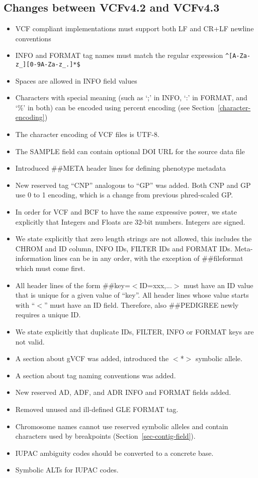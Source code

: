 \documentclass[8pt]{article}
\begin{document}
\subsection{Changes between VCFv4.2 and VCFv4.3}

\begin{itemize}
\item VCF compliant implementations must support both LF and CR+LF newline conventions
\item INFO and FORMAT tag names must match the regular expression \texttt{\^{}[A-Za-z\_][0-9A-Za-z\_.]*\$}
\item Spaces are allowed in INFO field values
\item Characters with special meaning (such as `;' in INFO, `:' in FORMAT, and `\%' in both) can be encoded using percent encoding (see Section~\ref{character-encoding})
\item The character encoding of VCF files is UTF-8.
\item The SAMPLE field can contain optional DOI URL for the source data file
\item Introduced \#\#META header lines for defining phenotype metadata
\item New reserved tag ``CNP'' analogous to ``GP'' was added. Both CNP and GP use 0 to 1 encoding, which is a change from previous phred-scaled GP.
\item In order for VCF and BCF to have the same expressive power, we state explicitly that Integers and Floats are 32-bit numbers.
Integers are signed.
\item We state explicitly that zero length strings are not allowed, this includes the CHROM and ID column, INFO IDs, FILTER IDs and FORMAT IDs.
Meta-information lines can be in any order, with the exception of \#\#fileformat which must come first. 
\item All header  lines of the form \#\#key=$<$ID=xxx,...$>$ must have an ID value that is unique for a given value of ``key''.
All header lines whose value starts with ``$<$'' must have an ID field.
Therefore, also \#\#PEDIGREE newly requires a unique ID.
\item We state explicitly that duplicate IDs, FILTER, INFO or FORMAT keys are not valid.
\item A section about gVCF was added, introduced the $<$*$>$ symbolic allele.
\item A section about tag naming conventions was added.
\item New reserved AD, ADF, and ADR INFO and FORMAT fields added.
\item Removed unused and ill-defined GLE FORMAT tag.
\item Chromosome names cannot use reserved symbolic alleles and contain characters used by breakpoints (Section~\ref{sec-contig-field}).
\item IUPAC ambiguity codes should be converted to a concrete base.
\item Symbolic ALTs for IUPAC codes.
\end{itemize}
\end{document}
